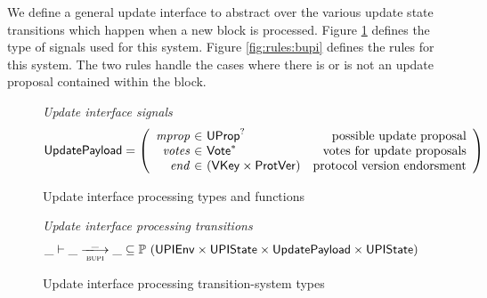 \documentclass[11pt,a4paper]{article}
\newcommand{\powerset}[1]{\mathbb{P}~#1}
\newcommand{\var}[1]{\mathit{#1}}
\newcommand{\type}[1]{\mathsf{#1}}
\newcommand{\trans}[2]{\xlongrightarrow[\textsc{#1}]{#2}}
\newcommand{\seqof}[1]{#1^{*}}
\newcommand{\VKey}{\type{VKey}}
\begin{document}
We define a general update interface to abstract over the various update state
transitions which happen when a new block is processed. Figure
\ref{fig:defs:bupi} defines the type of signals used for this system. Figure
\ref{fig:rules:bupi} defines the rules for this system. The two rules handle the
cases where there is or is not an update proposal contained within the block.

\begin{figure}[ht]
  \emph{Update interface signals}
  \begin{equation*}
    \UpdatePayload =
    \left(
      \begin{array}{r@{~\in~}lr}
        \var{mprop} & \UProp^{?} & \text{possible update proposal}\\
        \var{votes} & \seqof{\Vote} & \text{votes for update proposals}\\
        \var{end} & (\VKey \times \ProtVer) & \text{protocol version endorsment}
      \end{array}
    \right)
  \end{equation*}

  \caption{Update interface processing types and functions}
  \label{fig:defs:bupi}
\end{figure}

\begin{figure}[ht]
  \emph{Update interface processing transitions}
  \begin{equation*}
    \_ \vdash \var{\_} \trans{bupi}{\_} \var{\_} \subseteq
    \powerset (\UPIEnv \times \UPIState \times \UpdatePayload \times \UPIState)
  \end{equation*}
  \caption{Update interface processing transition-system types}
  \label{fig:ts-types:bupi}
\end{figure}
\end{document}
